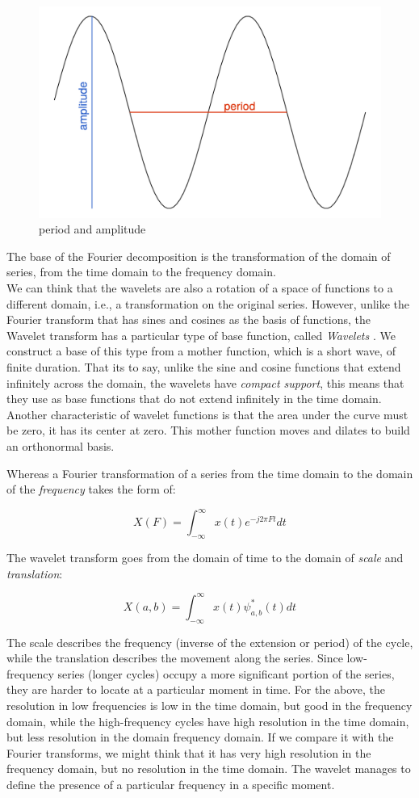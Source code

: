 \documentclass[a4paper,10cpi]{article}
\begin{document}
	
	\begin{figure}[H]
		\centering
		\includegraphics[width=0.65\linewidth]{ciclo_en.png}
		\caption{period and amplitude} \label{fig:ciclo}
	\end{figure}
	
	The base of the Fourier decomposition is the transformation of the domain of series, from the time domain to the frequency domain.
	\\
	
	We can think that the wavelets are also a rotation of a space of functions to a different domain, i.e., a transformation on the original series. However, unlike the Fourier transform that has sines and cosines as the basis of functions, the Wavelet transform has a particular type of base function, called \textit{Wavelets} \cite{castro1995wavelets}. We construct a base of this type from a mother function, which is a short wave, of finite duration. That its to say, unlike the sine and cosine functions that extend infinitely across the domain, the wavelets have \textit{compact support}, this means that they use as base functions that do not extend infinitely in the time domain. Another characteristic of wavelet functions is that the area under the curve must be zero, it has its center at zero. This mother function moves and dilates to build an orthonormal basis.
	
	Whereas a Fourier transformation of a series from the time domain to the domain of the \textit{frequency} takes the form of:
	
	$$
	X(F)=\int_{-\infty}^{\infty} x(t) e^{-j2\pi Ft}dt
	$$
	
	The wavelet transform goes from the domain of time to the domain of \textit{scale} and \textit{translation}:
	
	$$
	X(a,b)=\int_{-\infty}^{\infty} x(t) \psi^*_{a,b}(t)dt
	$$
	
	The scale describes the frequency (inverse of the extension or period) of the cycle, while the translation describes the movement along the series. Since low-frequency series (longer cycles) occupy a more significant portion of the series, they are harder to locate at a particular moment in time. For the above, the resolution in low frequencies is low in the time domain, but good in the frequency domain, while the high-frequency cycles have high resolution in the time domain, but less resolution in the domain frequency domain. If we compare it with the Fourier transforms, we might think that it has very high resolution in the frequency domain, but no resolution in the time domain. The wavelet manages to define the presence of a particular frequency in a specific moment.
	
\end{document}
